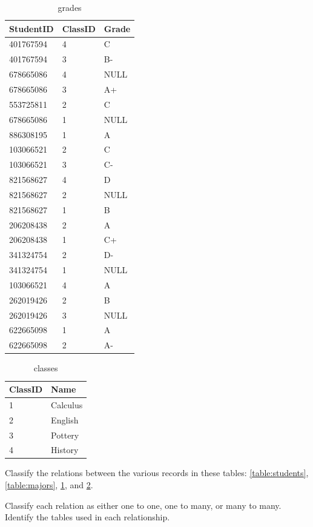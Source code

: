 \begin{table}
\begin{tabular}{|l|l|l|}
\hline
StudentID & ClassID & Grade \\
\hline
401767594 & 4 & C \\
401767594 & 3 & B- \\
678665086 & 4 & NULL \\
678665086 & 3 & A+ \\
553725811 & 2 & C \\
678665086 & 1 & NULL \\
886308195 & 1 & A \\
103066521 & 2 & C \\
103066521 & 3 & C- \\
821568627 & 4 & D \\
821568627 & 2 & NULL \\
821568627 & 1 & B \\
206208438 & 2 & A \\
206208438 & 1 & C+ \\
341324754 & 2 & D- \\
341324754 & 1 & NULL \\
103066521 & 4 & A \\
262019426 & 2 & B \\
262019426 & 3 & NULL \\
622665098 & 1 & A \\
622665098 & 2 & A- \\
\hline
\end{tabular}
\caption{grades}
\label{table:grades}
\end{table}

\begin{table}
\begin{tabular}{|l|l|}
\hline
ClassID & Name \\
\hline
1 & Calculus \\
2 & English \\
3 & Pottery \\
4 & History \\
\hline
\end{tabular}
\caption{classes}
\label{table:classes}
\end{table}

\begin{problem}
Classify the relations between the various records in these tables: \ref{table:students}, \ref{table:majors}, \ref{table:grades}, and \ref{table:classes}.

Classify each relation as either one to one, one to many, or many to many.
Identify the tables used in each relationship.
\label{prob:tablerelations}
\end{problem}

